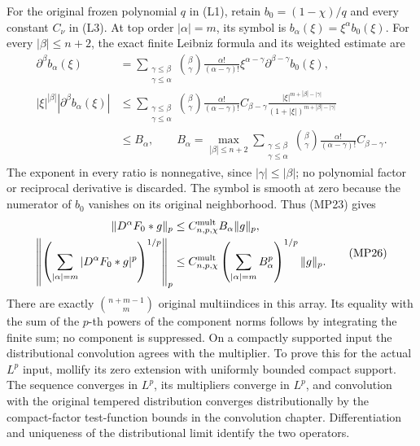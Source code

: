 \documentclass[
  11pt,
]{article}
\begin{document}
For the original frozen polynomial \(q\) in (L1), retain
\(b_0=(1-\chi)/q\) and every constant \(C_\nu\) in (L3). At top order
\(|\alpha|=m\), its symbol is \(b_\alpha(\xi)=\xi^\alpha b_0(\xi)\). For
every \(|\beta|\leq n+2\), the exact finite Leibniz formula and its
weighted estimate are \[
 \begin{split}
 \partial^\beta b_\alpha(\xi)
 &=\sum_{\substack{\gamma\leq\beta\\\gamma\leq\alpha}}
       \binom{\beta}{\gamma}\frac{\alpha!}{(\alpha-\gamma)!}
       \xi^{\alpha-\gamma}\partial^{\beta-\gamma}b_0(\xi),\\
 |\xi|^{|\beta|}|\partial^\beta b_\alpha(\xi)|
 &\leq\sum_{\substack{\gamma\leq\beta\\\gamma\leq\alpha}}
       \binom{\beta}{\gamma}\frac{\alpha!}{(\alpha-\gamma)!}
       C_{\beta-\gamma}
       \frac{|\xi|^{m+|\beta|-|\gamma|}}
            {(1+|\xi|)^{m+|\beta|-|\gamma|}}\\
 &\leq B_\alpha,\qquad
 B_\alpha=\max_{|\beta|\leq n+2}
       \sum_{\substack{\gamma\leq\beta\\\gamma\leq\alpha}}
       \binom{\beta}{\gamma}\frac{\alpha!}{(\alpha-\gamma)!}
       C_{\beta-\gamma}.
 \end{split}                                                   \tag{MP25}
\] The exponent in every ratio is nonnegative, since
\(|\gamma|\leq|\beta|\); no polynomial factor or reciprocal derivative
is discarded. The symbol is smooth at zero because the numerator of
\(b_0\) vanishes on its original neighborhood. Thus (MP23) gives \[
 \begin{split}
 \|D^\alpha F_0*g\|_p
 &\leq C^{\rm mult}_{n,p,\chi}B_\alpha\|g\|_p,\\
 \left\|\left(\sum_{|\alpha|=m}
               |D^\alpha F_0*g|^p\right)^{1/p}\right\|_p
 &\leq C^{\rm mult}_{n,p,\chi}
            \left(\sum_{|\alpha|=m}B_\alpha^p\right)^{1/p}\|g\|_p .
 \end{split}                                                   \tag{MP26}
\] There are exactly \(\binom{n+m-1}{m}\) original multiindices in this
array. Its equality with the sum of the \(p\)-th powers of the component
norms follows by integrating the finite sum; no component is suppressed.
On a compactly supported input the distributional convolution agrees
with the multiplier. To prove this for the actual \(L^p\) input, mollify
its zero extension with uniformly bounded compact support. The sequence
converges in \(L^p\), its multipliers converge in \(L^p\), and
convolution with the original tempered distribution converges
distributionally by the compact-factor test-function bounds in the
convolution chapter. Differentiation and uniqueness of the
distributional limit identify the two operators.
\end{document}
